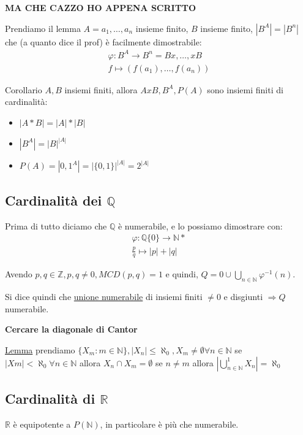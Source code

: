 \documentclass{article}
\begin{document}
\textbf{MA CHE CAZZO HO APPENA SCRITTO} \newline


Prendiamo il lemma $A = {a_1,\ldots,a_n}$ insieme finito, $B$ insieme finito, $|B^A| = |B^n|$ che (a quanto dice il prof) è facilmente dimostrabile:
\begin{align*}
         \varphi : B^A \to B^n = Bx,\ldots,xB \\
                   f \mapsto (f(a_1),\ldots,f(a_n))
\end{align*}

Corollario $A,B$ insiemi finiti, allora $AxB, B^A, P(A)$ sono insiemi finiti di cardinalità:
\begin{itemize}
        \item $|A*B| = |A|*|B|$	
        \item $|B^A| = |B|^{|A|}$
        \item $P(A) = |{0,1}^A| = |\{0,1\}|^{|A|} = 2^{|A|}$	
\end{itemize}


\subsection{Cardinalità dei $\mathbb{Q}$}

Prima di tutto diciamo che $\mathbb{Q}$ è numerabile, e lo possiamo dimostrare con:
\begin{align*}
        \varphi : \mathbb{Q}\{0\} \to \mathbb{N}* \\
        \frac{p}{q} \mapsto |p| + |q|
\end{align*}

Avendo $p,q \in \mathbb{Z}, p,q \not = 0, MCD(p,q)=1$ e quindi, $Q = {0} \cup \bigcup_{n \in \mathbb{N}}{\varphi^{-1}(n)}$.

Si dice quindi che \underline{unione numerabile} di insiemi finiti $\not = 0$ e disgiunti $\Rightarrow Q $ numerabile. \newline

\textbf{Cercare la diagonale di Cantor}

\underline{Lemma} prendiamo $\{X_m : m \in \mathbb{N}\}, |X_n| \le \aleph_0, X_m \not = \emptyset \forall n \in \mathbb{N}$ se $|Xm| < \aleph_0 \forall n \in \mathbb{N}$ allora $X_n \cap X_m = \emptyset$ se $n \not = m$ allora $|\bigcup_{n \in \mathbb{N}}^{1}X_n| = \aleph_0$ \newline


\subsection{Cardinalità di $\mathbb{R}$}
$ \mathbb{R}$ è equipotente a $P(\mathbb{N})$, in particolare è più che numerabile. \par
\end{document}
